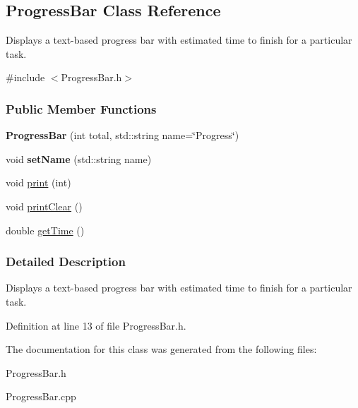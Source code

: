 \hypertarget{classProgressBar}{
\subsection{ProgressBar Class Reference}
\label{classProgressBar}
}


Displays a text-\/based progress bar with estimated time to finish for a particular task.  




{\ttfamily \#include $<$ProgressBar.h$>$}

\subsubsection*{Public Member Functions}
\begin{DoxyCompactItemize}
\item 
\hypertarget{classProgressBar_a2bdc2951819ac35419d55b9dcae74771}{
{\bfseries ProgressBar} (int total, std::string name=\char`\"{}Progress\char`\"{})}
\label{classProgressBar_a2bdc2951819ac35419d55b9dcae74771}

\item 
\hypertarget{classProgressBar_af90db5d2580eadcedddd308f6eb598b7}{
void {\bfseries setName} (std::string name)}
\label{classProgressBar_af90db5d2580eadcedddd308f6eb598b7}

\item 
\hypertarget{classProgressBar_aca2739594eca70b19a8b4c6c8d7b385f}{
void \hyperlink{classProgressBar_aca2739594eca70b19a8b4c6c8d7b385f}{print} (int)}
\label{classProgressBar_aca2739594eca70b19a8b4c6c8d7b385f}

\item 
\hypertarget{classProgressBar_a747aab6ee495c1c07f0fabe5d3e50ec4}{
void \hyperlink{classProgressBar_a747aab6ee495c1c07f0fabe5d3e50ec4}{printClear} ()}
\label{classProgressBar_a747aab6ee495c1c07f0fabe5d3e50ec4}

\item 
\hypertarget{classProgressBar_abcca17e287cdae4b0752e3c7a6428d91}{
double \hyperlink{classProgressBar_abcca17e287cdae4b0752e3c7a6428d91}{getTime} ()}
\label{classProgressBar_abcca17e287cdae4b0752e3c7a6428d91}

\end{DoxyCompactItemize}


\subsubsection{Detailed Description}
Displays a text-\/based progress bar with estimated time to finish for a particular task. 

Definition at line 13 of file ProgressBar.h.



The documentation for this class was generated from the following files:\begin{DoxyCompactItemize}
\item 
ProgressBar.h\item 
ProgressBar.cpp\end{DoxyCompactItemize}
